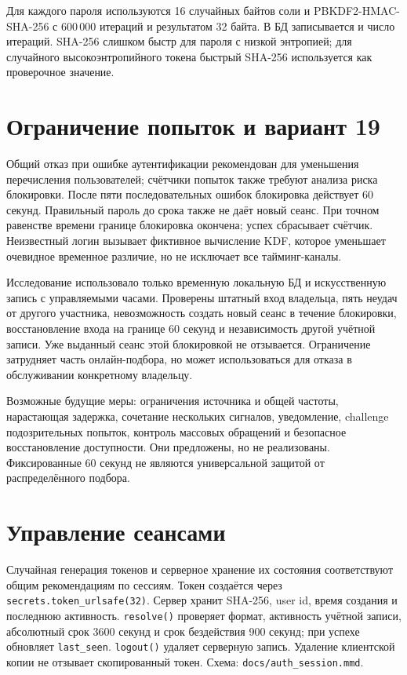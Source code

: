 \documentclass[12pt,a4paper]{article}
\begin{document}
Для каждого пароля используются 16 случайных байтов соли и PBKDF2-HMAC-SHA-256 с 600\,000 итераций и результатом 32 байта. В БД записывается и число итераций. SHA-256 слишком быстр для пароля с низкой энтропией; для случайного высокоэнтропийного токена быстрый SHA-256 используется как проверочное значение.

\section{Ограничение попыток и вариант 19}
Общий отказ при ошибке аутентификации рекомендован для уменьшения перечисления пользователей; счётчики попыток также требуют анализа риска блокировки. \cite{owasp-auth,nist}
После пяти последовательных ошибок блокировка действует 60 секунд. Правильный пароль до срока также не даёт новый сеанс. При точном равенстве времени границе блокировка окончена; успех сбрасывает счётчик. Неизвестный логин вызывает фиктивное вычисление KDF, которое уменьшает очевидное временное различие, но не исключает все тайминг-каналы.

Исследование использовало только временную локальную БД и искусственную запись с управляемыми часами. Проверены штатный вход владельца, пять неудач от другого участника, невозможность создать новый сеанс в течение блокировки, восстановление входа на границе 60 секунд и независимость другой учётной записи. Уже выданный сеанс этой блокировкой не отзывается. Ограничение затрудняет часть онлайн-подбора, но может использоваться для отказа в обслуживании конкретному владельцу.

Возможные будущие меры: ограничения источника и общей частоты, нарастающая задержка, сочетание нескольких сигналов, уведомление, challenge подозрительных попыток, контроль массовых обращений и безопасное восстановление доступности. Они предложены, но не реализованы. Фиксированные 60 секунд не являются универсальной защитой от распределённого подбора.

\section{Управление сеансами}
Случайная генерация токенов и серверное хранение их состояния соответствуют общим рекомендациям по сессиям. \cite{secrets,owasp-session}
Токен создаётся через \texttt{secrets.token\_urlsafe(32)}. Сервер хранит SHA-256, user id, время создания и последнюю активность. \texttt{resolve()} проверяет формат, активность учётной записи, абсолютный срок 3600 секунд и срок бездействия 900 секунд; при успехе обновляет \texttt{last\_seen}. \texttt{logout()} удаляет серверную запись. Удаление клиентской копии не отзывает скопированный токен. Схема: \texttt{docs/auth\_session.mmd}.
\end{document}
